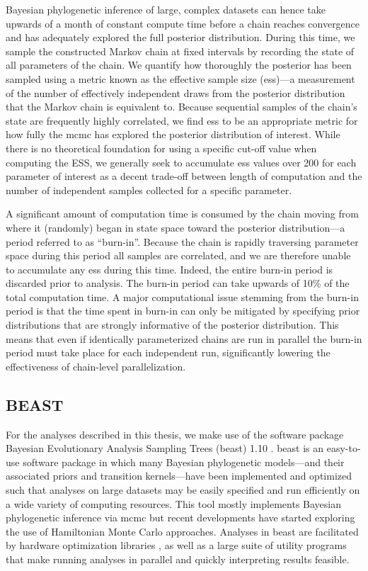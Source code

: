 Bayesian phylogenetic inference of large, complex datasets can hence take upwards of a month of constant compute time before a chain reaches convergence and has adequately explored the full posterior distribution.
During this time, we sample the constructed Markov chain at fixed intervals by recording the state of all parameters of the chain.
We quantify how thoroughly the posterior has been sampled using a metric known as the effective sample size (\gls{ess})---a measurement of the number of effectively independent draws from the posterior distribution that the Markov chain is equivalent to.
Because sequential samples of the chain's state are frequently highly correlated, we find \gls{ess} to be an appropriate metric for how fully the \gls{mcmc} has explored the posterior distribution of interest.
While there is no theoretical foundation for using a specific cut-off value when computing the ESS, we generally seek to accumulate \gls{ess} values over 200 for each parameter of interest as a decent trade-off between length of computation and the number of independent samples collected for a specific parameter.

A significant amount of computation time is consumed by the chain moving from where it (randomly) began in state space toward the posterior distribution---a period referred to as ``burn-in''.
Because the chain is rapidly traversing parameter space during this period all samples are correlated, and we are therefore unable to accumulate any \gls{ess} during this time.
Indeed, the entire burn-in period is discarded prior to analysis.
The burn-in period can take upwards of 10\% of the total computation time.
A major computational issue stemming from the burn-in period is that the time spent in burn-in can only be mitigated by specifying prior distributions that are strongly informative of the posterior distribution.
This means that even if identically parameterized chains are run in parallel the burn-in period must take place for each independent run, significantly lowering the effectiveness of chain-level parallelization.

\subsection{BEAST}

For the analyses described in this thesis, we make use of the software package Bayesian Evolutionary Analysis Sampling Trees (\gls{beast}) 1.10 \cite{suchard2018bayesian}.
\gls{beast} is an easy-to-use software package in which many Bayesian phylogenetic models---and their associated priors and transition kernels---have been implemented and optimized such that analyses on large datasets may be easily specified and run efficiently on a wide variety of computing resources.
This tool mostly implements Bayesian phylogenetic inference via \gls{mcmc} but recent developments have started exploring the use of Hamiltonian Monte Carlo approaches.
Analyses in \gls{beast} are facilitated by hardware optimization libraries \cite{ayres2019beagle}, as well as a large suite of utility programs that make running analyses in parallel and quickly interpreting results feasible.

